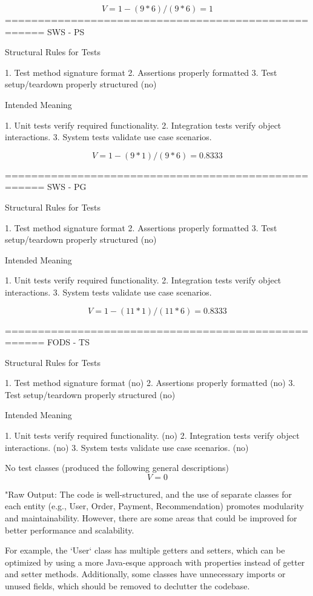 $$
V = 1 - (9*6)/(9*6) = 1
$$
====================================================
SWS - PS

Structural Rules for Tests

1. Test method signature format
2. Assertions properly formatted
3. Test setup/teardown properly structured (no)

Intended Meaning

1. Unit tests verify required functionality.
2. Integration tests verify object interactions. 
3. System tests validate use case scenarios. 

$$
V = 1 - (9*1)/(9*6) = 0.8333
$$

====================================================
SWS - PG

Structural Rules for Tests

1. Test method signature format
2. Assertions properly formatted
3. Test setup/teardown properly structured (no)

Intended Meaning

1. Unit tests verify required functionality.
2. Integration tests verify object interactions. 
3. System tests validate use case scenarios. 

$$
V = 1 - (11*1)/(11*6) = 0.8333
$$

====================================================
FODS - TS

Structural Rules for Tests

1. Test method signature format (no)
2. Assertions properly formatted (no)
3. Test setup/teardown properly structured (no)

Intended Meaning

1. Unit tests verify required functionality. (no)
2. Integration tests verify object interactions. (no)
3. System tests validate use case scenarios. (no)

No test classes (produced the following general descriptions)
$$
V = 0
$$

"Raw Output: The code is well-structured, and the use of separate classes for each entity (e.g., User, Order, Payment, Recommendation) promotes modularity and maintainability. However, there are some areas that could be improved for better performance and scalability.

For example, the `User` class has multiple getters and setters, which can be optimized by using a more Java-esque approach with properties instead of getter and setter methods. Additionally, some classes have unnecessary imports or unused fields, which should be removed to declutter the codebase.

